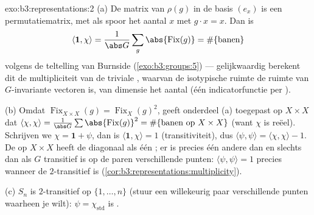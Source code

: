 \begin{solution}{exo:b3:representations:2}
(a) De matrix van $\rho(g)$ in de basis $(e_x)$ is een
permutatiematrix, met als spoor het aantal $x$ met $g\cdot x = x$.
Dan is
\[
\langle\mathbf 1, \chi\rangle = \frac1{\abs G}\sum_g
\abs{\operatorname{Fix}(g)} = \#\{\text{banen}\}
\]
volgens de teltelling van Burnside (\cref{exo:b3:groups:5}) ---
gelijkwaardig berekent dit de multipliciteit van de triviale
, waarvan de isotypische ruimte de ruimte van
$G$-invariante vectoren is, van dimensie het aantal  (één
indicatorfunctie per ).

(b) Omdat $\operatorname{Fix}_{X\times X}(g) =
\operatorname{Fix}_X(g)^2$, geeft onderdeel (a) toegepast op $X
\times X$ dat $\langle\chi,\chi\rangle = \frac1{\abs
G}\sum\abs{\operatorname{Fix}(g)}^2 = \#\{\text{banen op }
X\times X\}$ (want $\chi$ is reëel). Schrijven we $\chi = \mathbf
1 + \psi$, dan is $\langle\mathbf1,\chi\rangle = 1$
(transitiviteit), dus $\langle\psi,\psi\rangle =
\langle\chi,\chi\rangle - 1$. De  op $X\times X$ heeft de
diagonaal als één ; er is precies één andere  dan en
slechts dan als $G$ transitief is op de paren verschillende
punten: $\langle\psi,\psi\rangle = 1$ precies wanneer de 
$2$-transitief is (\cref{cor:b3:representations:multiplicity}).

(c) $S_n$ is $2$-transitief op $\{1,\dots,n\}$ (stuur een
willekeurig paar verschillende punten waarheen je wilt): $\psi =
\chi_{\mathrm{std}}$ is .
\end{solution}

